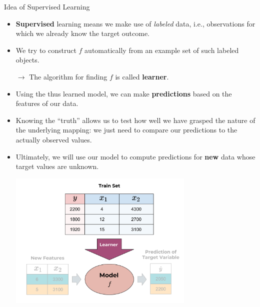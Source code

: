 \documentclass[11pt,compress,t,notes=noshow, xcolor=table]{beamer}
\begin{document}
\begin{vbframe}{Idea of Supervised Learning}
\begin{itemize}
  \item \textbf{Supervised} learning means we make use of \emph{labeled}
  data, i.e., observations for which we already know the target outcome.
  
  \item We try to construct $f$ automatically from an example set of such 
  labeled objects.
  
  $\rightarrow$ The algorithm for finding $f$ is called \textbf{learner}.
  
  \item Using the thus learned model, we can make \textbf{predictions} based on
  the features of our data.
  
  \item Knowing the \enquote{truth} allows us to test how well we have grasped 
  the nature of the underlying mapping: we just need to compare our predictions 
  to the actually observed values.
  
  \framebreak
  
  \item Ultimately, we will use our model to compute predictions for 
  \textbf{new} data whose target values are unknown.
  
  \begin{center}
    \includegraphics[width = 0.7\textwidth]{figure_man/the_inducer_web.png}
  \end{center}

\end{itemize}

\end{vbframe}

\end{document}
